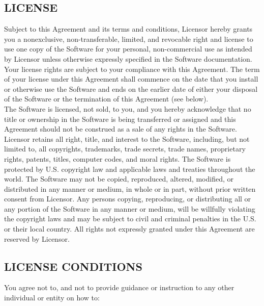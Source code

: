 \documentclass[11pt]{article}
\begin{document}
\subsection*{LICENSE}
Subject to this Agreement and its terms and conditions, Licensor hereby grants you a nonexclusive, non-transferable, limited, and revocable right and license to use one copy of the Software for your personal, non-commercial use as intended by Licensor unless otherwise expressly specified in the Software documentation. Your license rights are subject to your compliance with this Agreement. The term of your license under this Agreement shall commence on the date that you install or otherwise use the Software and ends on the earlier date of either your disposal of the Software or the termination of this Agreement (see below).\\[\baselineskip]
The Software is licensed, not sold, to you, and you hereby acknowledge that no title or ownership in the Software is being transferred or assigned and this Agreement should not be construed as a sale of any rights in the Software. Licensor retains all right, title, and interest to the Software, including, but not limited to, all copyrights, trademarks, trade secrets, trade names, proprietary rights, patents, titles, computer codes, and moral rights. The Software is protected by U.S. copyright law and applicable laws and treaties throughout the world. The Software may not be copied, reproduced, altered, modified, or distributed in any manner or medium, in whole or in part, without prior written consent from Licensor. Any persons copying, reproducing, or distributing all or any portion of the Software in any manner or medium, will be willfully violating the copyright laws and may be subject to civil and criminal penalties in the U.S. or their local country. All rights not expressly granted under this Agreement are reserved by Licensor.

\subsection*{LICENSE CONDITIONS}
You agree not to, and not to provide guidance or instruction to any other individual or entity on how to:
\end{document}
